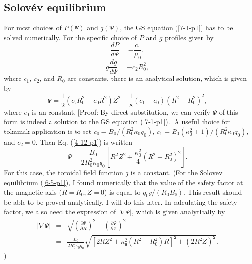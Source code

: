 \documentclass{llncs}
\begin{document}
\subsection{Solov{\'e}v equilibrium}\label{20-4-8-p1}

For most choices of $P (\Psi)$ and $g (\Psi)$, the GS equation (\ref{7-1-p1})
has to be solved numerically. For the specific choice of $P$ and $g$ profiles
given by
\begin{equation}
  \label{11-1-2} \frac{d P}{d \Psi} = - \frac{c_1}{\mu_0},
\end{equation}
\begin{equation}
  \label{3-15-a1} g \frac{d g}{d \Psi} = - c_2 R_0^2,
\end{equation}
where $c_1$, $c_2$, and $R_0$ are constants, there is an analytical solution,
which is given by{\cite{jardin2010}}
\begin{equation}
  \label{4-12-p1} \Psi = \frac{1}{2} (c_2 R_0^2 + c_0 R^2) Z^2 + \frac{1}{8}
  (c_1 - c_0) (R^2 - R_0^2)^2,
\end{equation}
where $c_0$ is an constant. [Proof: By direct substitution, we can verify
$\Psi$ of this form is indeed a solution to the GS equation (\ref{7-1-p1}).] A
useful choice for tokamak application is to set $c_0 = B_0 / (R_0^2 \kappa_0
q_0)$, $c_1 = B_0 (\kappa_0^2 + 1) / (R_0^2 \kappa_0 q_0)$, and $c_2 = 0$.
Then Eq. (\ref{4-12-p1}) is written
\begin{equation}
  \label{6-5-p1} \Psi = \frac{B_0}{2 R_0^2 \kappa_0 q_0} \left[ R^2 Z^2 +
  \frac{\kappa_0^2}{4} (R^2 - R_0^2)^2 \right] .
\end{equation}
For this case, the toroidal field function $g$ is a constant. (For the Solovev
equilibrium (\ref{6-5-p1}), I found numerically that the value of the safety
factor at the magnetic axis ($R = R_0, Z = 0$) is equal to $q_0 g / (R_0
B_0)$. This result should be able to be proved analytically. I will do this
later. In calculating the safety factor, we also need the expression of $|
\nabla \Psi |$, which is given analytically by
\begin{eqnarray}
  | \nabla \Psi | & = & \sqrt{\left( \frac{\partial \Psi}{\partial R}
  \right)^2 + \left( \frac{\partial \Psi}{\partial Z} \right)^2} \nonumber\\
  & = & \frac{B_0}{2 R_0^2 \kappa_0 q_0} \sqrt{[2 R Z^2 + \kappa_0^2 (R^2 -
  R_0^2) R]^2 + (2 R^2 Z)^2} . 
\end{eqnarray}
)

\
\end{document}

